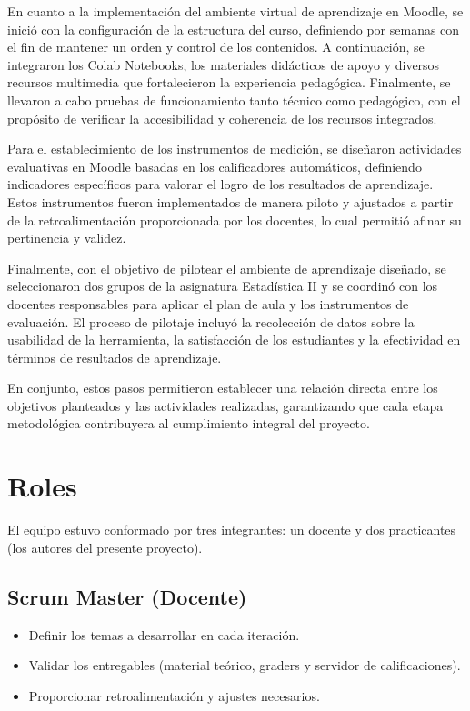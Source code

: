 \documentclass[letter,oneside,12pt,spanish]{report}
\begin{document}
En cuanto a la implementación del ambiente virtual de aprendizaje en Moodle, se inició con la configuración de la estructura del curso, definiendo por semanas con el fin de mantener un orden y control de los contenidos. A continuación, se integraron los Colab Notebooks, los materiales didácticos de apoyo y diversos recursos multimedia que fortalecieron la experiencia pedagógica. Finalmente, se llevaron a cabo pruebas de funcionamiento tanto técnico como pedagógico, con el propósito de verificar la accesibilidad y coherencia de los recursos integrados.

Para el establecimiento de los instrumentos de medición, se diseñaron actividades evaluativas en Moodle basadas en los calificadores automáticos, definiendo indicadores específicos para valorar el logro de los resultados de aprendizaje. Estos instrumentos fueron implementados de manera piloto y ajustados a partir de la retroalimentación proporcionada por los docentes, lo cual permitió afinar su pertinencia y validez.

Finalmente, con el objetivo de pilotear el ambiente de aprendizaje diseñado, se seleccionaron dos grupos de la asignatura Estadística II y se coordinó con los docentes responsables para aplicar el plan de aula y los instrumentos de evaluación. El proceso de pilotaje incluyó la recolección de datos sobre la usabilidad de la herramienta, la satisfacción de los estudiantes y la efectividad en términos de resultados de aprendizaje.

En conjunto, estos pasos permitieron establecer una relación directa entre los objetivos planteados y las actividades realizadas, garantizando que cada etapa metodológica contribuyera al cumplimiento integral del proyecto.

\section{Roles}

El equipo estuvo conformado por tres integrantes: un docente y dos practicantes (los autores del presente proyecto).

\subsection*{Scrum Master (Docente)}
\begin{itemize}[leftmargin=*]
	\item Definir los temas a desarrollar en cada iteración.
	\item Validar los entregables (material teórico, graders y servidor de calificaciones).
	\item Proporcionar retroalimentación y ajustes necesarios.
\end{itemize}
\end{document}

